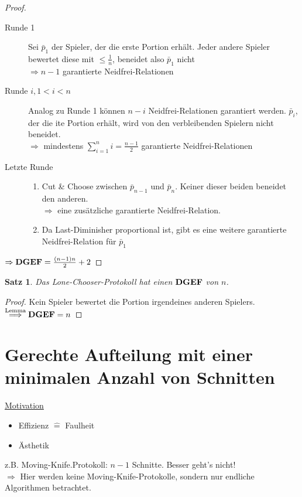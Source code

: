 \documentclass[a4paper,10pt]{scrartcl}
\newtheorem*{satz}{Satz}
\newcommand{\DGEF}{\text{\textbf{DGEF}}}
\begin{document}
\begin{proof}
 \begin{description}
  \item[Runde 1] Sei $\bar{p}_1$ der Spieler, der die erste Portion erhält. Jeder andere Spieler bewertet diese mit $\leq\frac{1}{n}$,
                 beneidet also $\bar{p}_1$ nicht\\$\Rightarrow n-1$ garantierte Neidfrei-Relationen
  \item[Runde $i, 1<i<n$] Analog zu Runde 1 können $n-i$ Neidfrei-Relationen garantiert werden. $\bar{p}_i$, der die ite Portion erhält, wird
                          von den verbleibenden Spielern nicht beneidet.\\$\Rightarrow$ mindestens $\sum\limits_{i=1}^ni=\frac{n-1}{2}$
                          garantierte Neidfrei-Relationen
  \item[Letzte Runde] \begin{enumerate}
                       \item Cut \& Choose zwischen $\bar{p}_{n-1}$ und $\bar{p}_n$. Keiner dieser beiden beneidet den anderen.\\
                             $\Rightarrow$ eine zusätzliche garantierte Neidfrei-Relation.
                       \item Da Last-Diminisher proportional ist, gibt es eine weitere garantierte Neidfrei-Relation für $\bar{p}_1$
                      \end{enumerate}
 \end{description}
$\Rightarrow\DGEF=\frac{(n-1)n}{2}+2$ 
\end{proof}
\begin{satz}
 Das Lone-Chooser-Protokoll hat einen $\DGEF$ von $n$.
\end{satz}
\begin{proof}
 Kein Spieler bewertet die Portion irgendeines anderen Spielers.\\$\stackrel{\text{Lemma}}{\Longrightarrow}\DGEF=n$
\end{proof}

\section{Gerechte Aufteilung mit einer minimalen Anzahl von Schnitten}
\underline{Motivation}
\begin{itemize}
 \item Effizienz $\widehat{=}$ Faulheit
 \item Ästhetik
\end{itemize}
z.B. Moving-Knife.Protokoll: $n-1$ Schnitte. Besser geht's nicht!\\
$\Rightarrow$ Hier werden keine Moving-Knife-Protokolle, sondern nur endliche Algorithmen betrachtet.

\end{document}

